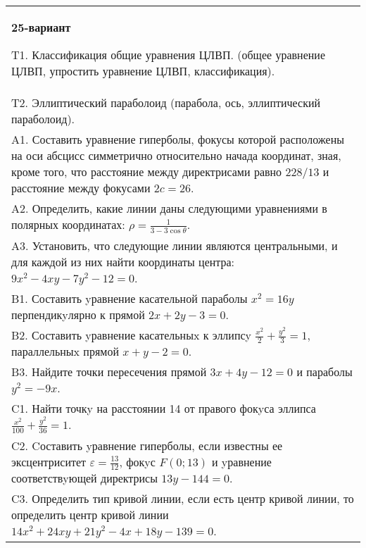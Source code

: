 \documentclass{article}
\begin{document}
\begin{tabular}{m{17cm}}
\textbf{25-вариант}
\newline

T1. Классификация общие уравнения ЦЛВП. (общее уравнение ЦЛВП, упростить уравнение ЦЛВП, классификация).\\

T2. Эллиптический параболоид (парабола, ось, эллиптический параболоид).\\

A1. Составить уравнение гиперболы, фокусы которой расположены на оси абсцисс симметрично относительно начада координат, зная, кроме того, что расстояние между директрисами равно $228/13$ и расстояние между фокусами $2c=26$.\\

A2. Определить, какие линии даны следующими уравнениями в полярных координатах: $\rho=\frac{1}{3-3\cos\theta}$.\\

A3. Установить, что следующие линии являются центральными, и для каждой из них найти координаты центра: $9x^{2}-4xy-7y^{2}-12=0$.\\

B1. Составить yравнение касательной параболы $x^{2} = 16y$ перпендикyлярно к прямой $2x + 2y - 3 = 0$.  \\

B2. Составить yравнение касательныx к эллипсy $\frac{x^{2}}{2} + \frac{y^{2}}{3} = 1$, параллельныx прямой $x + y - 2 = 0$.  \\

B3. Найдите точки пересечения прямой $3x + 4y - 12 = 0$ и параболы $y^{2} = - 9x$.  \\

C1. Найти точкy на расстоянии 14 от правого фокyса эллипса $\frac{x^{2}}{100}+\frac{y^{2}}{36}=1$.\\

C2. Cоставить yравнение гиперболы, если известны ее эксцентриситет $\varepsilon=\frac{13}{12}$, фокyс $F(0;13)$ и yравнение соответствyющей директрисы $13y-144=0$.  \\

C3. Определить тип кривой линии, если есть центр кривой линии, то определить центр кривой линии $14x^{2}+24xy+21y^{2}-4x+18y-139=0$.  \\

\end{tabular}
\vspace{1cm}
\end{document}
